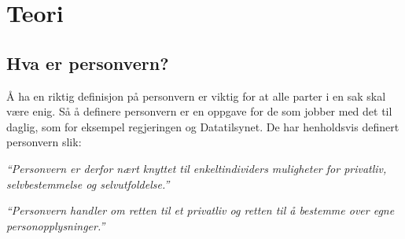 \section{Teori}

\subsection{Hva er personvern?}
Å ha en riktig definisjon på personvern er viktig for at alle parter i en sak skal være enig. Så å definere personvern er en oppgave for de som jobber med det til daglig, som for eksempel regjeringen og Datatilsynet. De har henholdsvis definert personvern slik:

\textit{``Personvern er derfor nært knyttet til enkeltindividers muligheter for privatliv, selvbestemmelse og selvutfoldelse.''} \parencite{regjeringen_personvern}

\textit{``Personvern handler om retten til et privatliv og retten til å bestemme over egne personopplysninger.''} \parencite{datatilsynet_personvern}


\parencite{regjeringen_nylov}\\
\parencite{test}\\

\newpage
